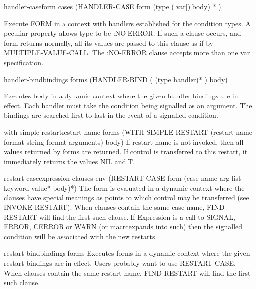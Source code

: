 \documentclass[10pt,english]{book}
\begin{document}
\begin{macro}{handler-case}{form \rest cases}
  (HANDLER-CASE form { (type ([var]) body) }* )

Execute FORM in a context with handlers established for the condition types. A
peculiar property allows type to be :NO-ERROR. If such a clause occurs, and
form returns normally, all its values are passed to this clause as if by
MULTIPLE-VALUE-CALL. The :NO-ERROR clause accepts more than one var
specification.
\end{macro}

\begin{macro}{handler-bind}{bindings \body forms}
  (HANDLER-BIND ( {(type handler)}* )  body)

Executes body in a dynamic context where the given handler bindings are in
effect. Each handler must take the condition being signalled as an argument.
The bindings are searched first to last in the event of a signalled
condition.
\end{macro}

\begin{macro}{with-simple-restart}{restart-name \body forms}
  (WITH-SIMPLE-RESTART (restart-name format-string format-arguments)
   body)
   If restart-name is not invoked, then all values returned by forms are
   returned. If control is transferred to this restart, it immediately
   returns the values NIL and T.
\end{macro}

\begin{macro}{restart-case}{expression \body clauses \env env}
  (RESTART-CASE form
   {(case-name arg-list {keyword value}* body)}*)
   The form is evaluated in a dynamic context where the clauses have special
   meanings as points to which control may be transferred (see INVOKE-RESTART).
   When clauses contain the same case-name, FIND-RESTART will find the first
   such clause. If Expression is a call to SIGNAL, ERROR, CERROR or WARN (or
   macroexpands into such) then the signalled condition will be associated with
   the new restarts.
\end{macro}

\begin{macro}{restart-bind}{bindings \body forms}
  Executes forms in a dynamic context where the given restart bindings are
   in effect. Users probably want to use RESTART-CASE. When clauses contain
   the same restart name, FIND-RESTART will find the first such clause.
\end{macro}
\end{document}
